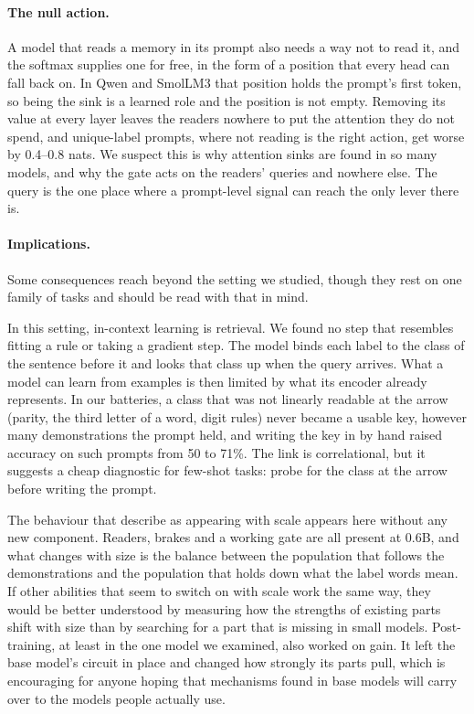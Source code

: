 \documentclass{article}
\begin{document}
\paragraph{The null action.} A model that reads a memory in its prompt also needs a way not to read it, and the softmax supplies one for free, in the form of a position that every head can fall back on. In Qwen and SmolLM3 that position holds the prompt's first token, so being the sink is a learned role and the position is not empty. Removing its value at every layer leaves the readers nowhere to put the attention they do not spend, and unique-label prompts, where not reading is the right action, get worse by 0.4--0.8 nats. We suspect this is why attention sinks are found in so many models, and why the gate acts on the readers' queries and nowhere else. The query is the one place where a prompt-level signal can reach the only lever there is.

\paragraph{Implications.} Some consequences reach beyond the setting we studied, though they rest on one family of tasks and should be read with that in mind.

In this setting, in-context learning is retrieval. We found no step that resembles fitting a rule or taking a gradient step. The model binds each label to the class of the sentence before it and looks that class up when the query arrives. What a model can learn from examples is then limited by what its encoder already represents. In our batteries, a class that was not linearly readable at the arrow (parity, the third letter of a word, digit rules) never became a usable key, however many demonstrations the prompt held, and writing the key in by hand raised accuracy on such prompts from 50 to 71\%. The link is correlational, but it suggests a cheap diagnostic for few-shot tasks: probe for the class at the arrow before writing the prompt.

The behaviour that \citet{wei2023larger} describe as appearing with scale appears here without any new component. Readers, brakes and a working gate are all present at 0.6B, and what changes with size is the balance between the population that follows the demonstrations and the population that holds down what the label words mean. If other abilities that seem to switch on with scale work the same way, they would be better understood by measuring how the strengths of existing parts shift with size than by searching for a part that is missing in small models. Post-training, at least in the one model we examined, also worked on gain. It left the base model's circuit in place and changed how strongly its parts pull, which is encouraging for anyone hoping that mechanisms found in base models will carry over to the models people actually use.
\end{document}
